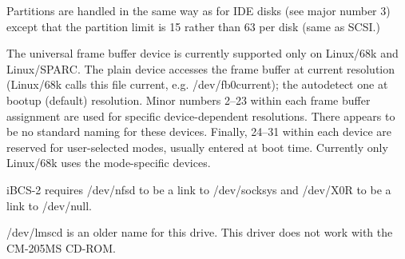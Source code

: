 \noindent
Partitions are handled in the same way as for IDE disks (see major
number 3) except that the partition limit is 15 rather than 63 per
disk (same as SCSI.)

\begin{devicelist}
	\minordots
	\minordots
	\minordots
\end{devicelist}

\noindent
The universal frame buffer device is currently supported only on
Linux/68k and Linux/SPARC.  The plain device accesses the frame
buffer at current resolution (Linux/68k calls this file {\file
current}, e.g. {\file /dev/fb0current}); the {\file autodetect} one at
bootup (default) resolution.  Minor numbers 2--23 within each frame
buffer assignment are used for specific device-dependent resolutions.
There appears to be no standard naming for these devices.  Finally,
24--31 within each device are reserved for user-selected modes,
usually entered at boot time.  Currently only Linux/68k uses the
mode-specific devices.

\begin{devicelist}
\end{devicelist}

\begin{devicelist}
\end{devicelist}

\noindent
iBCS-2 requires {\file /dev/nfsd} to be a link to {\file /dev/socksys}
and {\file /dev/X0R} to be a link to {\file /dev/null}.

\begin{devicelist}
\end{devicelist}

\noindent
{\file /dev/lmscd} is an older name for this drive.  This driver does
not work with the CM-205MS CD-ROM.

